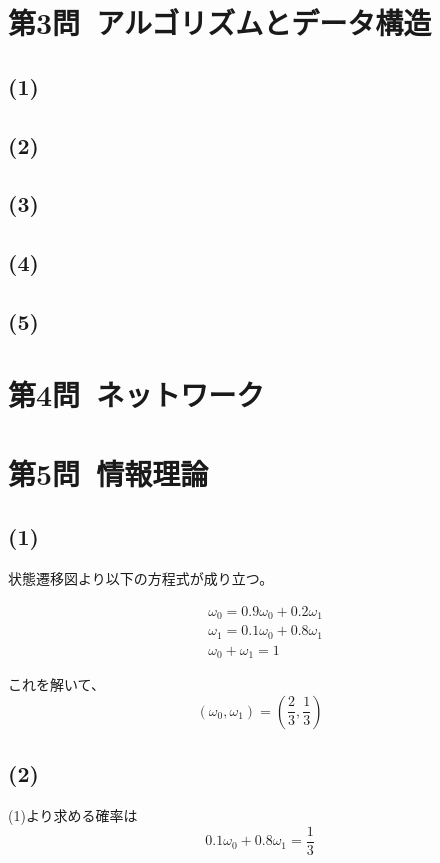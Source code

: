 \documentclass[a4paper,12pt,xelatex,ja=standard]{bxjsarticle}
\begin{document}
\section*{第3問\ アルゴリズムとデータ構造}
\subsection*{(1)}

\subsection*{(2)}

\subsection*{(3)}

\subsection*{(4)}

\subsection*{(5)}

\section*{第4問\ ネットワーク}

\section*{第5問\ 情報理論}
\subsection*{(1)}
状態遷移図より以下の方程式が成り立つ。

\begin{equation*}
  \begin{split}
    &\omega_0 = 0.9 \omega_0 + 0.2 \omega_1 \\
    &\omega_1 = 0.1 \omega_0 + 0.8 \omega_1 \\
    &\omega_0 + \omega_1 = 1
  \end{split}
\end{equation*}

これを解いて、
\[
  (\omega_0, \omega_1) = (\frac{2}{3}, \frac{1}{3})
\]

\subsection*{(2)}
(1)より求める確率は
\[
  0.1 \omega_0 + 0.8 \omega_1 = \frac{1}{3}
\]
\end{document}

